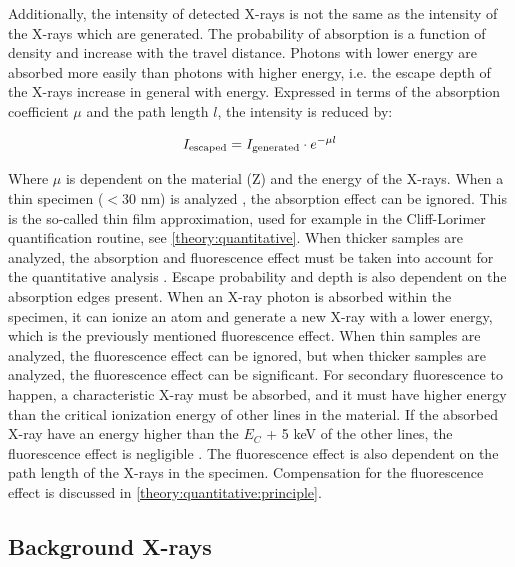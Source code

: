 Additionally, the intensity of detected X-rays is not the same as the intensity of the X-rays which are generated.
The probability of absorption is a function of density and increase with the travel distance.
Photons with lower energy are absorbed more easily than photons with higher energy, i.e. the escape depth of the X-rays increase in general with energy.
Expressed in terms of the absorption coefficient $\mu$ and the path length $l$, the intensity is reduced by:

\begin{equation}
    \label{eq:theory:xray_formation:escape}
    I_{\textnormal{escaped}} = I_{\textnormal{generated}} \cdot e^{-\mu l}
\end{equation}

Where $\mu$ is dependent on the material (Z) and the energy of the X-rays.
When a thin specimen ($<30$ nm) is analyzed \cite{watanabe_williams_zeta_2006}, the absorption effect can be ignored.
This is the so-called thin film approximation, used for example in the Cliff-Lorimer quantification routine, see \cref{theory:quantitative}.
When thicker samples are analyzed, the absorption and fluorescence effect must be taken into account for the quantitative analysis \cite{goldstein_scanning_2018}.
Escape probability and depth is also dependent on the absorption edges present.
When an X-ray photon is absorbed within the specimen, it can ionize an atom and generate a new X-ray with a lower energy, which is the previously mentioned fluorescence effect.
When thin samples are analyzed, the fluorescence effect can be ignored, but when thicker samples are analyzed, the fluorescence effect can be significant.
For secondary fluorescence to happen, a characteristic X-ray must be absorbed, and it must have higher energy than the critical ionization energy of other lines in the material.
If the absorbed X-ray have an energy higher than the $E_C$ + 5 keV of the other lines, the fluorescence effect is negligible \cite[p. 306]{goldstein_scanning_2018}.
The fluorescence effect is also dependent on the path length of the X-rays in the specimen.
Compensation for the fluorescence effect is discussed in \cref{theory:quantitative:principle}.









\subsection{Background X-rays}
\label{theory:xray_formation:background}

